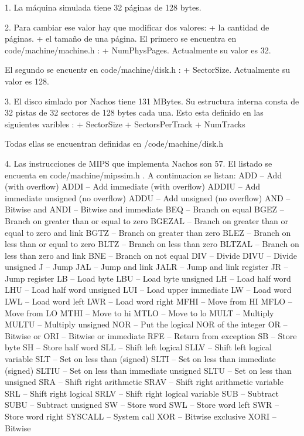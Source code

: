 1.  La máquina simulada tiene 32 páginas de 128 bytes.

2.  Para cambiar ese valor hay que modificar dos valores:
            + la cantidad de páginas.
            + el tamaño de una página.
    El primero se encuentra en code/machine/machine.h :
        + NumPhysPages. Actualmente su valor es 32.

    El segundo se encuentr en code/machine/disk.h :
        + SectorSize. Actualmente su valor es 128.

3. El disco simlado por Nachos tiene 131 MBytes. Su estructura interna consta de 32 pistas de 32 sectores de 128 bytes cada una. Esto esta definido en las siguientes varibles :
    + SectorSize
    + SectorsPerTrack
    + NumTracks

Todas ellas se encuentran definidas en /code/machine/disk.h

4. Las instrucciones de MIPS que implementa Nachos son 57. El listado se encuenta en code/machine/mipssim.h . A continuacion se listan:
ADD – Add (with overflow)
ADDI -- Add immediate (with overflow)
ADDIU -- Add immediate unsigned (no overflow)
ADDU -- Add unsigned (no overflow)
AND -- Bitwise and
ANDI -- Bitwise and immediate
BEQ -- Branch on equal
BGEZ -- Branch on greater than or equal to zero
BGEZAL -- Branch on greater than or equal to zero and link
BGTZ -- Branch on greater than zero
BLEZ -- Branch on less than or equal to zero
BLTZ -- Branch on less than zero
BLTZAL -- Branch on less than zero and link
BNE -- Branch on not equal
DIV -- Divide
DIVU -- Divide unsigned
J -- Jump
JAL -- Jump and link
JALR -- Jump and link register
JR -- Jump register
LB -- Load byte
LBU -- Load byte unsigned
LH -- Load half word
LHU -- Load half word unsigned
LUI -- Load upper immediate
LW -- Load word
LWL -- Load word left
LWR -- Load word right
MFHI -- Move from HI
MFLO -- Move from LO
MTHI -- Move to hi
MTLO -- Move to lo
MULT -- Multiply
MULTU -- Multiply unsigned
NOR -- Put the logical NOR of the integer
OR -- Bitwise or
ORI -- Bitwise or immediate
RFE -- Return from exception
SB -- Store byte
SH -- Store half word 
SLL -- Shift left logical
SLLV -- Shift left logical variable
SLT -- Set on less than (signed)
SLTI -- Set on less than immediate (signed)
SLTIU -- Set on less than immediate unsigned
SLTU -- Set on less than unsigned
SRA -- Shift right arithmetic
SRAV -- Shift right arithmetic variable
SRL -- Shift right logical
SRLV -- Shift right logical variable
SUB -- Subtract
SUBU -- Subtract unsigned
SW -- Store word
SWL -- Store word left
SWR -- Store word right
SYSCALL -- System call
XOR -- Bitwise exclusive
XORI -- Bitwise

